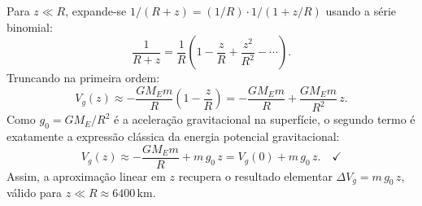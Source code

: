 Para $z\ll R$, expande-se $1/(R+z) = (1/R)\cdot 1/(1+z/R)$ usando a série binomial:
\[
\frac{1}{R+z} = \frac{1}{R}\left(1 - \frac{z}{R} + \frac{z^{2}}{R^{2}} - \cdots\right).
\]
Truncando na primeira ordem:
\[
V_g(z) \approx -\frac{GM_E m}{R}\left(1 - \frac{z}{R}\right) = -\frac{GM_E m}{R} + \frac{GM_E m}{R^{2}}\,z.
\]
Como $g_0 = GM_E/R^{2}$ é a aceleração gravitacional na superfície, o segundo termo é exatamente a expressão clássica da energia potencial gravitacional:
\[
V_g(z) \approx -\frac{GM_E m}{R} + m\,g_0\,z = V_g(0) + m\,g_0\,z.\quad\checkmark
\]
Assim, a aproximação linear em $z$ recupera o resultado elementar $\Delta V_g = m\,g_0\,z$, válido para $z \ll R \approx 6400\,\mathrm{km}$.